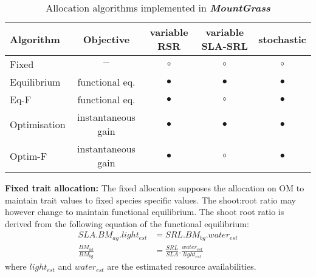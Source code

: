 \documentclass[a4paper,twoside, justified,marginals=raggedright]{tufte-handout}
\newcommand{\model}{\textit{\textbf{MountGrass }}}
\begin{document}
\begin{table*}
\caption{Allocation algorithms implemented in \model} 
\label{table:state_var_plant}
\begin{tabular}{l|c|c c c}
Algorithm & Objective & variable RSR & variable SLA-SRL & stochastic \\ 
\hline 
Fixed & $-$ & $\circ$ & $\circ$ & $\circ$ \\
Equilibrium & functional eq. & $\bullet$ & $\bullet$ & $\bullet$ \\
Eq-F & functional eq. & $\bullet$ & $\circ$ & $\bullet$ \\
Optimisation & instantaneous gain & $\bullet$ & $\bullet$ & $\bullet$ \\
Optim-F & instantaneous gain & $\bullet$ & $\circ$ & $\bullet$ \\
\end{tabular} 
\vspace*{0.5cm}
\end{table*}

\textbf{Fixed trait allocation:} The fixed allocation supposes the allocation on OM to maintain trait values to fixed species specific values. The shoot:root ratio may however change to maintain functional equilibrium. The shoot root ratio is derived from the following equation of the functional equilibrium:
\begin{align}\label{eq:equilibrium}
SLA . BM_{ag} . light_{est} &= SRL . BM_{bg} . water_{est}\\
\frac{BM_{ab}}{BM_{bg}} &= \frac{SRL}{SLA} . \frac{water_{est}}{light_{est}}
\end{align}
where $light_{est}$ and $water_{est}$ are the estimated resource availabilities.
%
\end{document}
